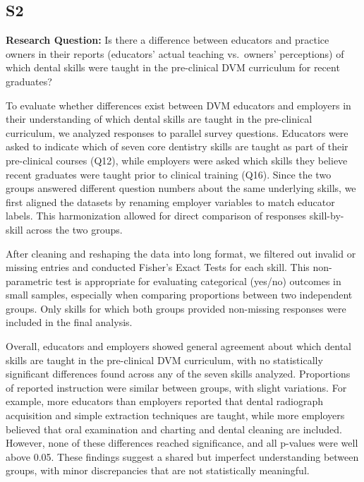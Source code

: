 \documentclass[
  12pt,
  letterpaper,
  DIV=11,
  numbers=noendperiod]{scrartcl}
\numberwithin{figure}{section}
\numberwithin{table}{section}
\begin{document}
\subsection{S2}\label{s2}

\textbf{Research Question:} Is there a difference between educators and
practice owners in their reports (educators' actual teaching vs.~owners'
perceptions) of which dental skills were taught in the pre-clinical DVM
curriculum for recent graduates?

To evaluate whether differences exist between DVM educators and
employers in their understanding of which dental skills are taught in
the pre-clinical curriculum, we analyzed responses to parallel survey
questions. Educators were asked to indicate which of seven core
dentistry skills are taught as part of their pre-clinical courses (Q12),
while employers were asked which skills they believe recent graduates
were taught prior to clinical training (Q16). Since the two groups
answered different question numbers about the same underlying skills, we
first aligned the datasets by renaming employer variables to match
educator labels. This harmonization allowed for direct comparison of
responses skill-by-skill across the two groups.

After cleaning and reshaping the data into long format, we filtered out
invalid or missing entries and conducted Fisher's Exact Tests for each
skill. This non-parametric test is appropriate for evaluating
categorical (yes/no) outcomes in small samples, especially when
comparing proportions between two independent groups. Only skills for
which both groups provided non-missing responses were included in the
final analysis.

Overall, educators and employers showed general agreement about which
dental skills are taught in the pre-clinical DVM curriculum, with no
statistically significant differences found across any of the seven
skills analyzed. Proportions of reported instruction were similar
between groups, with slight variations. For example, more educators than
employers reported that dental radiograph acquisition and simple
extraction techniques are taught, while more employers believed that
oral examination and charting and dental cleaning are included. However,
none of these differences reached significance, and all p-values were
well above 0.05. These findings suggest a shared but imperfect
understanding between groups, with minor discrepancies that are not
statistically meaningful.
\end{document}
